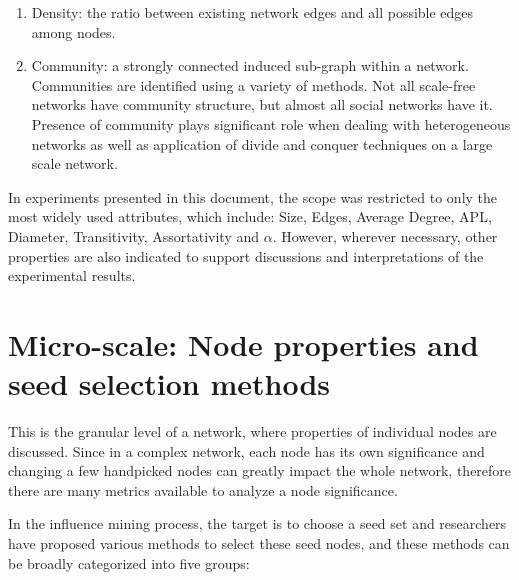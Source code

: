 \begin{enumerate}
		\item Density: the ratio between existing network edges and all possible edges among nodes.
		
		\item Community: a strongly connected induced sub-graph within a network. Communities are identified using a variety of methods. Not all scale-free networks have community structure, but almost all social networks have it. Presence of community plays significant role when dealing with heterogeneous networks as well as application of divide and conquer techniques on a large scale network.
		
	\end{enumerate}
	
	In experiments presented in this document, the scope was restricted to only the most widely used attributes, which include: Size, Edges, Average Degree, APL, Diameter, Transitivity, Assortativity and $\alpha$. However, wherever necessary, other properties are also indicated to support discussions and interpretations of the experimental results.
	

	\section{Micro-scale: Node properties and seed selection methods}
	\label{sec:domain-micro-scale}
	This is the granular level of a network, where properties of individual nodes are discussed. Since in a complex network, each node has its own significance and changing a few handpicked nodes can greatly impact the whole network, therefore there are many metrics available to analyze a node significance.
	
	In the influence mining process, the target is to choose a seed set and researchers have proposed various methods to select these seed nodes, and these methods can be broadly categorized into five groups:	
	
